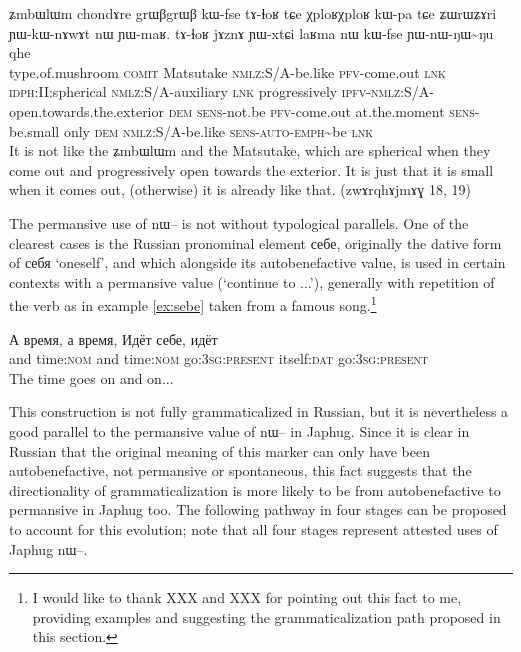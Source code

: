 \documentclass[oldfontcommands,oneside,a4paper,11pt]{article}
\newcommand{\ipa}[1]{{\phon \mbox{#1}}} %
\begin{document}
\begin{exe}
 \ex \label{ex:YWnWNWNu}
 \gll
\ipa{ʑmbɯlɯm}	\ipa{chondɤre}  	\ipa{grɯβgrɯβ}  	\ipa{kɯ-fse}  	\ipa{tɤ-ɬoʁ}  	\ipa{tɕe}  	\ipa{χploʁχploʁ}  	\ipa{kɯ-pa}  
\ipa{tɕe}  	\ipa{ʑɯrɯʑɤri}  	\ipa{ɲɯ-kɯ-nɤwɤt}  	\ipa{nɯ}  	\ipa{ɲɯ-maʁ.}  
\ipa{tɤ-ɬoʁ}  	\ipa{jɤznɤ}  	\ipa{ɲɯ-xtɕi}  	\ipa{laʁma}  	\ipa{nɯ}  	\ipa{kɯ-fse}  	\ipa{ɲɯ-nɯ-ŋɯ\textasciitilde{}ŋu}  	\ipa{qhe}  	\\
type.of.mushroom \textsc{comit} Matsutake \textsc{nmlz}:S/A-be.like \textsc{pfv}-come.out \textsc{lnk} \textsc{idph:II:}spherical \textsc{nmlz}:S/A-auxiliary \textsc{lnk} progressively \textsc{ipfv}-\textsc{nmlz}:S/A-open.towards.the.exterior \textsc{dem} \textsc{sens}-not.be  \textsc{pfv}-come.out at.the.moment \textsc{sens}-be.small only \textsc{dem} \textsc{nmlz}:S/A-be.like \textsc{sens-auto}-\textsc{emph}\textasciitilde{}be \textsc{lnk} \\
\glt It is not like the \ipa{ʑmbɯlɯm} and the Matsutake, which are spherical when they come out and progressively open towards the exterior. It is just that it is small when it comes out, (otherwise) it is already like that.
 (\ipa{zwɤrqhɤjmɤɣ} 18, 19)
 \end{exe}

%

The permansive use of \ipa{nɯ--} is not without typological parallels. One of the clearest cases is the Russian pronominal element \ipa{себе}, originally the dative form of \ipa{себя} `oneself', and which alongside its autobenefactive value,  is used in certain contexts with a permansive value (`continue to ...'), generally with repetition of the verb as in example \ref{ex:sebe} taken from a famous song.\footnote{I would like to thank XXX and XXX for pointing out this fact to me, providing examples and suggesting the grammaticalization path proposed in this section.}
 
\begin{exe}
 \ex \label{ex:sebe}
 \gll
\ipa{А} 	\ipa{время,} 	\ipa{а} 	\ipa{время,} 	\ipa{Идёт} 	\ipa{себе,} 	\ipa{идёт} \\
 and time:\textsc{nom}  and time:\textsc{nom}  go:\textsc{3sg:present} itself:\textsc{dat} go:\textsc{3sg:present} \\
\glt The time goes on and on...
 \end{exe}

This construction is not fully grammaticalized in Russian, but it is nevertheless a good parallel to the permansive value of \ipa{nɯ--} in Japhug. Since it is clear in Russian that the original meaning of this marker can only have been autobenefactive, not permansive or spontaneous, this fact suggests that the directionality of grammaticalization is more likely to be from autobenefactive to permansive in Japhug too. The following pathway in four stages can be proposed to account for this evolution; note that all four stages represent attested uses of Japhug \ipa{nɯ--}.
\end{document}
